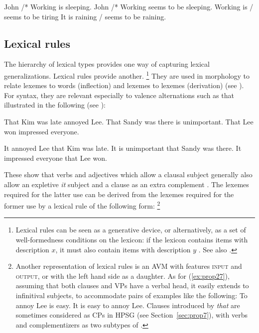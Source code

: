 \documentclass[output=paper
	        ,collection
	        ,collectionchapter
 	        ,biblatex
                ,babelshorthands
                ,newtxmath
                ,draftmode
                ,colorlinks, citecolor=brown
]{langscibook}
\begin{document}
\eal\label{ex:prop25}
\ex John /* Working is sleeping.
\ex John /* Working seems to be sleeping.
\ex Working is / seems to be tiring
\ex It is raining / seems to be raining.
\zl

\subsection{Lexical rules}\label{sec:prop4.2}
\label{prop:sec-lex-rules}

The hierarchy of lexical types provides one way of capturing lexical generalizations. Lexical rules provide another.%
%
\footnote{Lexical rules can be seen as a generative device, or alternatively, as a set of
  well-formedness conditions on the lexicon: if the lexicon contains items with description $x$, it
  must also contain items with description $y$ \citep{Meurers2001a}. See also .}
%
They are used in morphology to relate lexemes to words (inflection) and lexemes to lexemes
(derivation) (see ). For syntax, they are relevant especially to valence alternations such as that illustrated in the following (see ):

\eal\label{ex:prop26}
\ex That Kim was late annoyed Lee.
\ex That Sandy was there is unimportant. 
\ex That Lee won impressed everyone.
\zl
	
\eal\label{ex:prop27}
\ex It annoyed Lee that Kim was late.
\ex It is unimportant that Sandy was there. 
\ex It impressed everyone that Lee won.
\zl

\noindent
These show that verbs and adjectives which allow a clausal subject generally also allow an expletive \emph{it} subject and a clause as an extra complement \citep[150]{ps2}. The lexemes required for the latter use can be derived from the lexemes required for the former use by a lexical rule of the following form:%
%
\footnote{Another representation of lexical rules is an AVM with features \textsc{input} and \textsc{output}, or with the left hand side as a daughter. As for (\ref{ex:prop27}), assuming that both clauses and VPs have a verbal head, it easily extends to infinitival subjects, to accommodate pairs of examples like the following:
	\eal
        \ex To annoy Lee is easy.
	\ex It is easy to annoy Lee.
	\zl
Clauses introduced by \emph{that} are sometimes considered as CPs in HPSG (see Section~\ref{sec:prop7}), with verbs and complementizers as two subtypes of .
}
%
\end{document}
